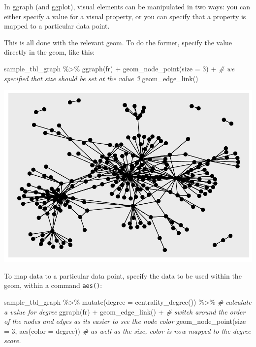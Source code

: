 \documentclass[
]{book}
\newenvironment{Shaded}{\begin{snugshade}}{\end{snugshade}}
\newcommand{\AttributeTok}[1]{\textcolor[rgb]{0.77,0.63,0.00}{#1}}
\newcommand{\CommentTok}[1]{\textcolor[rgb]{0.56,0.35,0.01}{\textit{#1}}}
\newcommand{\DecValTok}[1]{\textcolor[rgb]{0.00,0.00,0.81}{#1}}
\newcommand{\FunctionTok}[1]{\textcolor[rgb]{0.00,0.00,0.00}{#1}}
\newcommand{\NormalTok}[1]{#1}
\newcommand{\SpecialCharTok}[1]{\textcolor[rgb]{0.00,0.00,0.00}{#1}}
\newcommand{\StringTok}[1]{\textcolor[rgb]{0.31,0.60,0.02}{#1}}
\begin{document}
In ggraph (and ggplot), visual elements can be manipulated in two ways: you can either specify a value for a visual property, or you can specify that a property is mapped to a particular data point.

This is all done with the relevant geom. To do the former, specify the value directly in the geom, like this:

\begin{Shaded}
\begin{Highlighting}[]
\NormalTok{sample\_tbl\_graph }\SpecialCharTok{\%\textgreater{}\%} 
  \FunctionTok{ggraph}\NormalTok{(}\StringTok{\textquotesingle{}fr\textquotesingle{}}\NormalTok{) }\SpecialCharTok{+} 
  \FunctionTok{geom\_node\_point}\NormalTok{(}\AttributeTok{size =} \DecValTok{3}\NormalTok{) }\SpecialCharTok{+} \CommentTok{\# we specified that size should be set at the value 3}
  \FunctionTok{geom\_edge\_link}\NormalTok{()}
\end{Highlighting}
\end{Shaded}

\includegraphics{_main_files/figure-latex/unnamed-chunk-60-1.pdf}

To map data to a particular data point, specify the data to be used within the geom, within a command \texttt{aes()}:

\begin{Shaded}
\begin{Highlighting}[]
\NormalTok{sample\_tbl\_graph }\SpecialCharTok{\%\textgreater{}\%} 
  \FunctionTok{mutate}\NormalTok{(}\AttributeTok{degree =} \FunctionTok{centrality\_degree}\NormalTok{()) }\SpecialCharTok{\%\textgreater{}\%} \CommentTok{\# calculate a value for degree}
  \FunctionTok{ggraph}\NormalTok{(}\StringTok{\textquotesingle{}fr\textquotesingle{}}\NormalTok{) }\SpecialCharTok{+} 
  \FunctionTok{geom\_edge\_link}\NormalTok{() }\SpecialCharTok{+} \CommentTok{\# switch around the order of the nodes and edges as it\textquotesingle{}s easier to see the node color}
  \FunctionTok{geom\_node\_point}\NormalTok{(}\AttributeTok{size =} \DecValTok{3}\NormalTok{, }\FunctionTok{aes}\NormalTok{(}\AttributeTok{color =}\NormalTok{ degree)) }\CommentTok{\# as well as the size, color is now mapped to the degree score.}
\end{Highlighting}
\end{Shaded}
\end{document}
